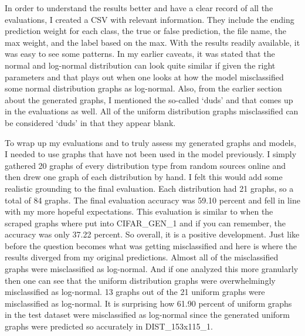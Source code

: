 \documentclass[12pt]{article}
\begin{document}
            In order to understand the results better and have a clear record of all the evaluations, 
            I created a CSV with relevant information. They include the ending prediction weight for each class, 
            the true or false prediction, the file name, the max weight, and the label based on the max.
            With the results readily available, it was easy to see some patterns. 
            In my earlier caveats, it was stated that the normal and log-normal distribution can look quite similar 
            if given the right parameters and that plays out when one looks at 
            how the model misclassified some normal distribution graphs as log-normal. 
            Also, from the earlier section about the generated graphs, 
            I mentioned the so-called ‘duds’ and that comes up in the evaluations as well. 
            All of the uniform distribution graphs misclassified can be considered ‘duds’ in that they appear blank.
            
            To wrap up my evaluations and to truly assess my generated graphs and models, 
            I needed to use graphs that have not been used in the model previously. 
            I simply gathered 20 graphs of every distribution type from random sources online 
            and then drew one graph of each distribution by hand. I felt this would add some realistic grounding to the final evaluation. 
            Each distribution had 21 graphs, so a total of 84 graphs. 
            The final evaluation accuracy was 59.10 percent and fell in line with my more hopeful expectations. 
            This evaluation is similar to when the scraped graphs where put into CIFAR\_GEN\_1 and if you can remember, 
            the accuracy was only 37.22 percent. So overall, it is a positive development. 
            Just like before the question becomes what was getting misclassified 
            and here is where the results diverged from my original predictions. 
            Almost all of the misclassified graphs were misclassified as log-normal. 
            And if one analyzed this more granularly then one can see 
            that the uniform distribution graphs were overwhelmingly misclassified as log-normal. 
            13 graphs out of the 21 uniform graphs were misclassified as log-normal. 
            It is surprising how 61.90 percent of uniform graphs in the test dataset were misclassified as log-normal 
            since the generated uniform graphs were predicted so accurately in DIST\_153x115\_1.
            
\end{document}

